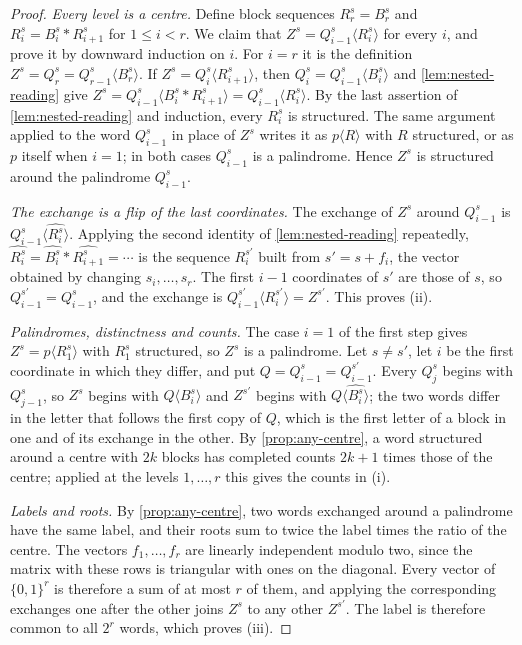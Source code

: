 \begin{proof}
\emph{Every level is a centre.} Define block sequences $R_r^s=B_r^s$ and
$R_i^s=B_i^s\ast R_{i+1}^s$ for $1\leqslant i<r$. We claim that $Z^s=Q_{i-1}^s\langle R_i^s\rangle$
for every $i$, and prove it by downward induction on $i$. For $i=r$ it is the definition
$Z^s=Q_r^s=Q_{r-1}^s\langle B_r^s\rangle$. If $Z^s=Q_i^s\langle R_{i+1}^s\rangle$, then
$Q_i^s=Q_{i-1}^s\langle B_i^s\rangle$ and \cref{lem:nested-reading} give
$Z^s=Q_{i-1}^s\langle B_i^s\ast R_{i+1}^s\rangle=Q_{i-1}^s\langle R_i^s\rangle$. By the last
assertion of \cref{lem:nested-reading} and induction, every $R_i^s$ is structured. The same
argument applied to the word $Q_{i-1}^s$ in place of $Z^s$ writes it as $p\langle R\rangle$ with $R$
structured, or as $p$ itself when $i=1$; in both cases $Q_{i-1}^s$ is a palindrome. Hence $Z^s$ is
structured around the palindrome $Q_{i-1}^s$.

\emph{The exchange is a flip of the last coordinates.} The exchange of $Z^s$ around $Q_{i-1}^s$ is
$Q_{i-1}^s\langle\widehat{R_i^s}\rangle$. Applying the second identity of \cref{lem:nested-reading}
repeatedly, $\widehat{R_i^s}=\widehat{B_i^s}\ast\widehat{R_{i+1}^s}=\cdots$ is the sequence $R_i^{s'}$
built from $s'=s+f_i$, the vector obtained by changing $s_i,\dots,s_r$. The first $i-1$ coordinates
of $s'$ are those of $s$, so $Q_{i-1}^{s'}=Q_{i-1}^s$, and the exchange is
$Q_{i-1}^{s'}\langle R_i^{s'}\rangle=Z^{s'}$. This proves (ii).

\emph{Palindromes, distinctness and counts.} The case $i=1$ of the first step gives
$Z^s=p\langle R_1^s\rangle$ with $R_1^s$ structured, so $Z^s$ is a palindrome. Let $s\neq s'$, let
$i$ be the first coordinate in which they differ, and put $Q=Q_{i-1}^s=Q_{i-1}^{s'}$. Every
$Q_j^s$ begins with $Q_{j-1}^s$, so $Z^s$ begins with $Q\langle B_i^s\rangle$ and $Z^{s'}$ begins
with $Q\langle\widehat{B_i^s}\rangle$; the two words differ in the letter that follows the first
copy of $Q$, which is the first letter of a block in one and of its exchange in the other. By
\cref{prop:any-centre}, a word structured around a centre with $2k$ blocks has completed counts
$2k+1$ times those of the centre; applied at the levels $1,\dots,r$ this gives the counts in (i).

\emph{Labels and roots.} By \cref{prop:any-centre}, two words exchanged around a palindrome have the
same label, and their roots sum to twice the label times the ratio of the centre. The vectors
$f_1,\dots,f_r$ are linearly independent modulo two, since the matrix with these rows is triangular
with ones on the diagonal. Every vector of $\{0,1\}^r$ is therefore a sum of at most $r$ of them,
and applying the corresponding exchanges one after the other joins $Z^s$ to any other $Z^{s'}$.
The label is therefore common to all $2^r$ words, which proves (iii).
\end{proof}

